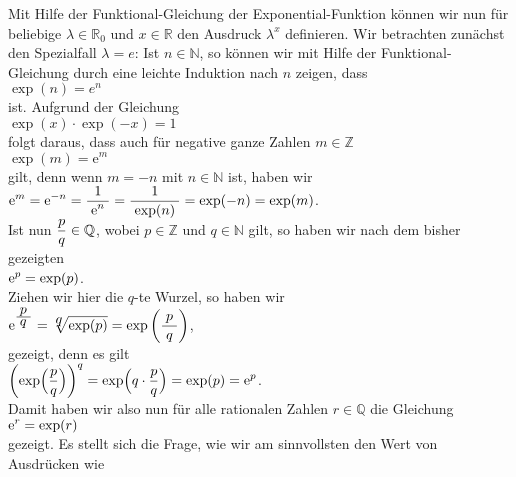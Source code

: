 \remark
Mit Hilfe der Funktional-Gleichung der Exponential-Funktion k\"onnen wir nun f\"ur beliebige $\lambda \in \mathbb{R}_0$
und $x \in \mathbb{R}$ den Ausdruck $\lambda^x$ definieren.  Wir betrachten zun\"achst den Spezialfall
$\lambda = e$:
Ist $n \in \mathbb{N}$, so k\"onnen wir mit Hilfe der Funktional-Gleichung durch eine leichte Induktion
nach $n$ zeigen, dass 
\\[0.2cm]
\hspace*{1.3cm}
$\exp(n) = e^n$
\\[0.2cm]
ist.  Aufgrund der Gleichung
\\[0.2cm]
\hspace*{1.3cm}
$\exp(x) \cdot \exp(-x) = 1$
\\[0.2cm]
folgt daraus, dass auch f\"ur negative ganze Zahlen $m \in \mathbb{Z}$ 
\\[0.2cm]
\hspace*{1.3cm}
$\exp(m) = \mathrm{e}^m$
\\[0.2cm]
gilt, denn wenn $m = -n$ mit $n \in \mathbb{N}$ ist, haben wir
\\[0.2cm]
\hspace*{1.3cm}
$\displaystyle \mathrm{e}^m = \mathrm{e}^{-n} = \displaystyle\frac{\;\displaystyle1\;}{\;\displaystyle\mathrm{e}^n\;} = \displaystyle\frac{\;\displaystyle1\;}{\;\displaystyle\exp(n)\;} = \exp(-n) = \exp(m)$.
\\[0.2cm]
Ist nun $\displaystyle\frac{p}{q} \in \mathbb{Q}$, wobei $p \in \mathbb{Z}$ und $q \in \mathbb{N}$ gilt, so haben wir 
nach dem bisher gezeigten
\\[0.2cm]
\hspace*{1.3cm}
$\displaystyle \mathrm{e}^p = \exp(p)$.
\\[0.2cm]
Ziehen wir hier die $q$-te Wurzel, so haben wir
\\[0.2cm]
\hspace*{1.3cm}
$\displaystyle \mathrm{e}^{\textstyle\frac{\;\textstyle p\;}{\;\textstyle q\;}} = \sqrt[\textstyle q]{\exp(p)} = \exp\left(\displaystyle\frac{\;\displaystyle p\;}{\;\displaystyle q\;}\right)$,
\\[0.2cm]
gezeigt, denn es gilt
\\[0.2cm]
\hspace*{1.3cm}
$\displaystyle\left(\exp\Bigl(\frac{p}{q}\Bigr)\right)^q = \exp\Bigl(q \cdot \frac{p}{q}\Bigr) = \exp(p) = \mathrm{e}^p$.
\\[0.2cm]
Damit haben wir also nun f\"ur alle rationalen Zahlen $r \in \mathbb{Q}$ die Gleichung
\\[0.2cm]
\hspace*{1.3cm}
$\displaystyle \mathrm{e}^r = \exp(r)$
\\[0.2cm]
gezeigt.  Es stellt sich die Frage, wie wir am sinnvollsten den Wert von Ausdr\"ucken wie
